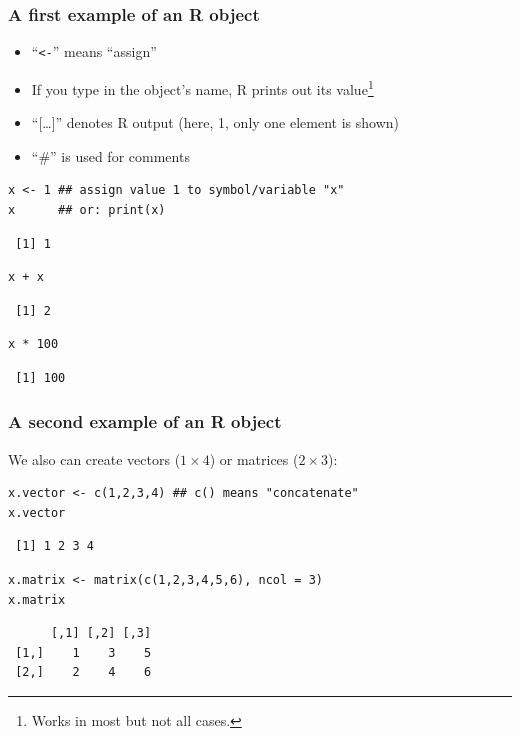 \documentclass[bigger]{beamer}
\begin{document}
\begin{frame}[fragile]
\frametitle{A first example of an R object}
\label{sec-1-2-3}

\begin{itemize}
\item \enquote{\texttt{<-}} means \enquote{assign}
\item If you type in the object's name, R prints out its value\footnote{Works in most but not all cases.
 }
\item \enquote{[\ldots{}]} denotes R output (here, 1, only one element is shown)
\item \enquote{\#} is used for comments
\end{itemize}



\lstset{language=R}
\begin{lstlisting}
x <- 1 ## assign value 1 to symbol/variable "x"
x      ## or: print(x)
\end{lstlisting}

\begin{verbatim}
 [1] 1
\end{verbatim}


\lstset{language=R}
\begin{lstlisting}
x + x
\end{lstlisting}

\begin{verbatim}
 [1] 2
\end{verbatim}


\lstset{language=R}
\begin{lstlisting}
x * 100
\end{lstlisting}

\begin{verbatim}
 [1] 100
\end{verbatim}
\end{frame}
\begin{frame}[fragile]
\frametitle{A second example of an R object}
\label{sec-1-2-4}


    We also can create vectors ($1\times4$) or matrices ($2\times3$):
    

\lstset{language=R}
\begin{lstlisting}
x.vector <- c(1,2,3,4) ## c() means "concatenate" 
x.vector
\end{lstlisting}

\begin{verbatim}
 [1] 1 2 3 4
\end{verbatim}



\lstset{language=R}
\begin{lstlisting}
x.matrix <- matrix(c(1,2,3,4,5,6), ncol = 3)
x.matrix
\end{lstlisting}

\begin{verbatim}
      [,1] [,2] [,3]
 [1,]    1    3    5
 [2,]    2    4    6
\end{verbatim}
\end{frame}
\end{document}
